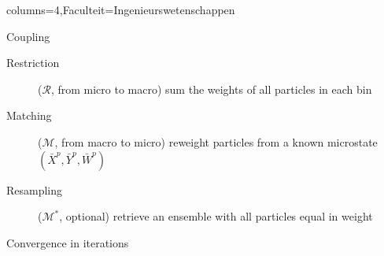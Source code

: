 \documentclass[portrait,a1paper,fontscale=0.45]{kuleuvenposter}
\begin{document}
\begin{poster}{columns=4,Faculteit=Ingenieurswetenschappen}
\begin{posterbox}[name=macroscopic, column=1,row=0, above=parareal micro-macro]{Coupling}
\begin{description}
\item[Restriction]($\mathcal{R}$, from micro to macro) sum the weights of all particles in each bin
\item[Matching]($\mathcal{M}$, from macro to micro) reweight particles from a known microstate $(\bar{X}^p, \bar{Y}^p, \bar{W}^p)$
\item[Resampling]($\mathcal{M}^*$, optional) retrieve an ensemble with all particles equal in weight
\end{description}
\end{posterbox}

\begin{posterbox}[name=convergenceK, column=2, below=notset, above=bottom, borderColor=KULeuvenFaculteit]{Convergence in iterations}%
\end{posterbox}


\end{poster}
\end{document}
